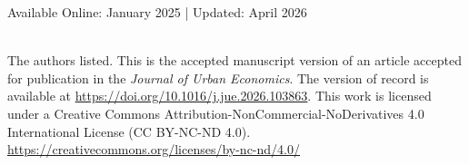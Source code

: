 \documentclass[11pt]{article}
\begin{document}
\noindent Available Online: January 2025 | Updated: April 2026

\vfill 
\noindent{\color{usfgreen} \rule{\textwidth}{5pt}}\\
{\small 
\textcopyright{} The authors listed. This is the accepted manuscript version of an article accepted for publication 
in the \emph{Journal of Urban Economics}. The version of record is available at 
\url{https://doi.org/10.1016/j.jue.2026.103863}. This work is licensed under a Creative Commons 
Attribution-NonCommercial-NoDerivatives 4.0 International License (CC BY-NC-ND 4.0).
\url{https://creativecommons.org/licenses/by-nc-nd/4.0/}
}
\thispagestyle{empty}
\end{document}
